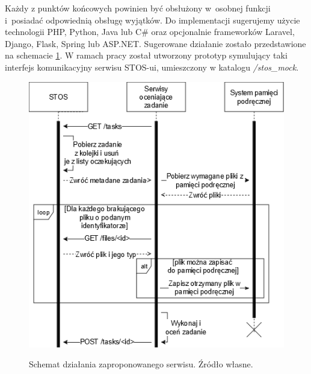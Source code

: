 Każdy z punktów końcowych powinien być obsłużony w~osobnej funkcji i~posiadać odpowiednią obsługę wyjątków. Do implementacji sugerujemy użycie technologii PHP, Python, Java lub C\# oraz opcjonalnie frameworków Laravel, Django, Flask, Spring lub ASP.NET. Sugerowane działanie zostało przedstawione na schemacie \ref{stos-suggestion}. W ramach pracy został utworzony prototyp symulujący taki interfejs komunikacyjny serwisu STOS-ui, umieszczony w katalogu \textit{/stos\_mock}.
\begin{figure}[!h]
	\begin{center}
		\resizebox{0.8\textwidth}{!} {
			\includegraphics{img/5/stos-suggestion.png}
		}
		\caption[Schemat działania zaproponowanego serwisu. Źródło własne.]{Schemat działania zaproponowanego serwisu. Źródło własne.}
    \label{stos-suggestion}
	\end{center}
\end{figure}
